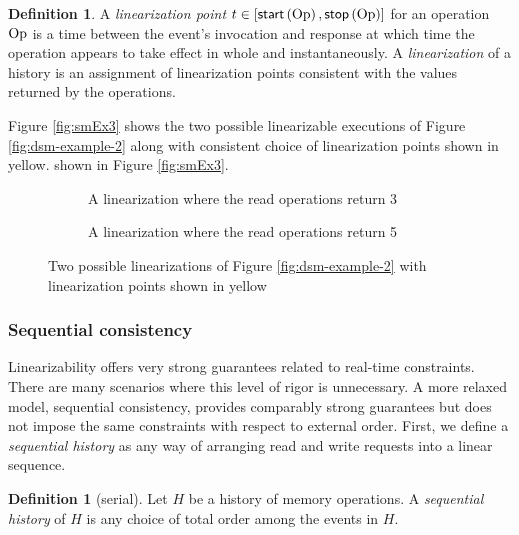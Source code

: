 \documentclass[]             %
{NASA}                       %
\theoremstyle{definition}
\newtheorem{definition}[theorem]{Definition}
\begin{document}
\begin{definition}
  A \emph{linearization point} $t \in [\mathsf{start}\left(\mathrm{Op}\right), \mathsf{stop}\left(\mathrm{Op}\right)]$
  for an operation $\mathrm{Op}$ is a time between the event's invocation and
  response at which time the operation appears to take effect in whole
  and instantaneously. A \emph{linearization} of a history is an
  assignment of linearization points consistent with the values
  returned by the operations.
\end{definition}

Figure \ref{fig:smEx3} shows the two possible linearizable executions
of Figure \ref{fig:dsm-example-2} along with consistent choice of
linearization points shown in yellow.  shown in Figure
\ref{fig:smEx3}.

\begin{figure}
  \begin{subfigure}{1\textwidth}
    \centering
    
    \caption{A linearization where the read operations return 3}
    \label{fig:dsm-example-2-linearizations-a}
  \end{subfigure}
  \begin{subfigure}{1\textwidth}
    
        \caption{A linearization where the read operations return 5}
    \label{fig:dsm-example-2-linearizations-b}
  \end{subfigure}
  \caption{Two possible linearizations of Figure \ref{fig:dsm-example-2} with linearization points shown in yellow}
  \label{fig:dsm-example-2-linearizations}
\end{figure}

\subsubsection{Sequential consistency}
\label{sequential-consistency}

Linearizability offers very strong guarantees related to real-time
constraints. There are many scenarios where this level of rigor is
unnecessary. A more relaxed model, sequential consistency, provides
comparably strong guarantees but does not impose the same constraints
with respect to external order. First, we define a \emph{sequential
  history} as any way of arranging read and write requests into a
linear sequence.

\begin{definition}[serial]
  \label{def:sequential-history}
  Let $H$ be a history of memory operations. A \emph{sequential
    history} of $H$ is any choice of total order among the events in
  $H$.
\end{definition}
\end{document}
